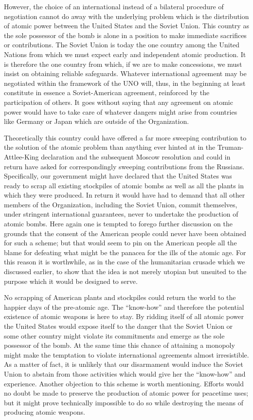 However, the choice of an international instead of a bilateral procedure of negotiation cannot do away with the underlying problem which is the distribution of atomic power between the United States and the Soviet Union. This country as the sole possessor of the bomb is alone in a position to make immediate sacrifices or contributions. The Soviet Union is today the one country among the United Nations from which we must expect early and independent atomic production. It is therefore the one country from which, if we are to make concessions, we must insist on obtaining reliable safeguards. Whatever international agreement may be negotiated within the framework of the UNO will, thus, in the beginning at least constitute in essence a Soviet-American agreement, reinforced by the participation of others. It goes without saying that any agreement on atomic power would have to take care of whatever dangers might arise from countries like Germany or Japan which are outside of the Organization.

Theoretically this country could have offered a far more sweeping contribution to the solution of the atomic problem than anything ever hinted at in the Truman-Attlee-King declaration and the subsequent Moscow resolution and could in return have asked for correspondingly sweeping contributions from the Russians. Specifically, our government might have declared that the United States was ready to scrap all existing stockpiles of atomic bombs as well as all the plants in which they were produced. In return it would have had to demand that all other members of the Organization, including the Soviet Union, commit themselves, under stringent international guarantees, never to undertake the production of atomic bombs. Here again one is tempted to forego further discussion on the grounds that the consent of the American people could never have been obtained for such a scheme; but that would seem to pin on the American people all the blame for defeating what might be the panacea for the ills of the atomic age. For this reason it is worthwhile, as in the case of the humanitarian crusade which we discussed earlier, to show that the idea is not merely utopian but unsuited to the purpose which it would be designed to serve.

No scrapping of American plants and stockpiles could return the world to the happier days of the pre-atomic age. The ``know-how'' and therefore the potential existence of atomic weapons is here to stay. By ridding itself of all atomic power the United States would expose itself to the danger that the Soviet Union or some other country might violate its commitments and emerge as the sole possessor of the bomb. At the same time this chance of attaining a monopoly might make the temptation to violate international agreements almost irresistible. As a matter of fact, it is unlikely that our disarmament would induce the Soviet Union to abstain from those activities which would give her the ``know-how'' and experience. Another objection to this scheme is worth mentioning. Efforts would no doubt be made to preserve the production of atomic power for peacetime uses; but it might prove technically impossible to do so while destroying the means of producing atomic weapons.

